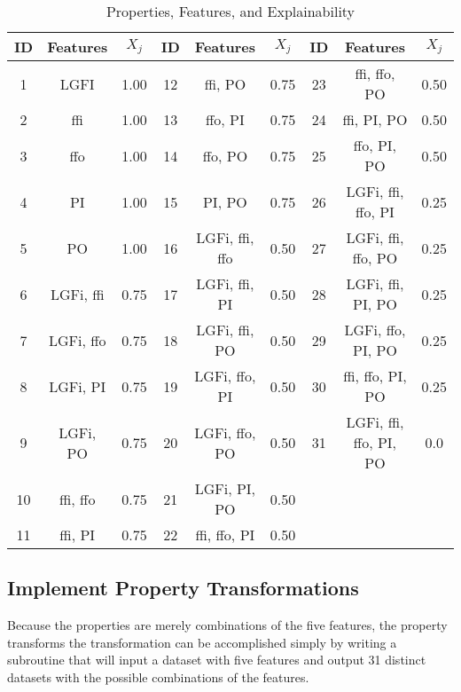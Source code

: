 \begin{table}[H]
    \renewcommand{\arraystretch}{1.3}
    \centering
    \caption{Properties, Features, and Explainability}
    \begin{tabular}{|c|c|c||c|c|c||c|c|c|}
        \hline
        \bfseries ID & \bfseries Features & \bfseries $X_j$ & \bfseries ID & \bfseries Features & \bfseries $X_j$ & \bfseries ID & \bfseries Features & \bfseries $X_j$ \\
        \hline
        \hline
        1 & LGFI & 1.00 & 12 & ffi, PO & 0.75 & 23 & ffi, ffo, PO & 0.50 \\
        \hline
        2 & ffi & 1.00 & 13 & ffo, PI  & 0.75 & 24 & ffi, PI, PO & 0.50 \\
        \hline
        3 & ffo & 1.00 & 14 & ffo, PO & 0.75 & 25 & ffo, PI, PO & 0.50 \\
        \hline
        4 & PI & 1.00 & 15 & PI, PO & 0.75 & 26 & LGFi, ffi, ffo, PI & 0.25 \\
        \hline
        5 & PO & 1.00 & 16 & LGFi, ffi, ffo & 0.50 & 27 & LGFi, ffi, ffo, PO & 0.25 \\
        \hline
        6 & LGFi, ffi & 0.75 & 17 &  LGFi, ffi, PI & 0.50 & 28 & LGFi, ffi, PI, PO & 0.25 \\
        \hline
        7 & LGFi, ffo & 0.75 & 18 & LGFi, ffi, PO & 0.50 & 29 & LGFi, ffo, PI, PO & 0.25 \\
        \hline
        8 & LGFi, PI & 0.75 & 19 & LGFi, ffo, PI & 0.50 & 30 & ffi, ffo, PI, PO & 0.25 \\
        \hline
        9 & LGFi, PO & 0.75 & 20 & LGFi, ffo, PO & 0.50 & 31 & LGFi, ffi, ffo, PI, PO & 0.0\\
        \hline
        10 & ffi, ffo & 0.75 & 21 & LGFi, PI, PO & 0.50 \\
        \cline{0-5}
        11 & ffi, PI & 0.75 & 22 & ffi, ffo, PI & 0.50 \\
        \cline{0-5}
    \end{tabular}
    \label{tab_prop_id}
\end{table}

\subsection{Implement Property Transformations}

Because the properties are merely combinations of the five features, the
property transforms the transformation can be accomplished simply by writing a
subroutine that will input a dataset with five features and output 31 distinct
datasets with the possible combinations of the features.

